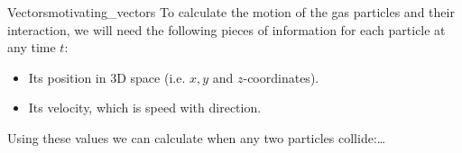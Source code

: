 \begin{motivation}{Vectors}{motivating_vectors}
    \vspace{1em}
    To calculate the motion of the gas particles and their interaction, we will need the following pieces of information for each particle at any time $t$:
    \begin{itemize}
        \item Its position in 3D space (i.e. $x,y$ and $z$-coordinates).
        \item Its velocity, which is speed with direction.
    \end{itemize}

    Using these values we can calculate when any two particles collide:\ldots

\end{motivation}

%
%
%
